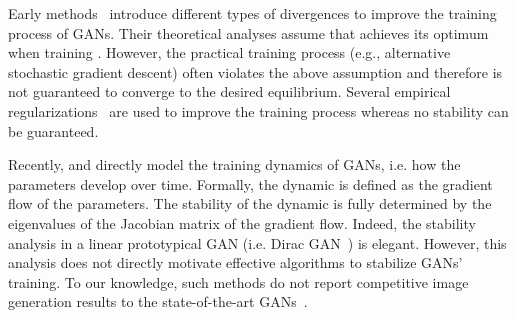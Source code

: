\documentclass{article}
\theoremstyle{definition}
\begin{document}
Early methods~\citep{mao2017least,gulrajani2017improved, arjovsky2017wasserstein,du2018learning} introduce different types of divergences to improve the training process of GANs. Their theoretical analyses assume that  achieves its optimum when training .
However, the practical training process (e.g., alternative stochastic gradient descent) often violates the above assumption and therefore is not guaranteed to converge to the desired equilibrium. Several empirical regularizations~\cite{miyato2018spectral,gulrajani2017improved,zhang2019consistency} are used to improve the training process whereas no stability can be guaranteed.

Recently, \citet{mescheder2017numerics} and \citet{nagarajan2017gradient} directly model the training dynamics of GANs, i.e. how the parameters develop over time. 
Formally, the dynamic is defined as the gradient flow of the parameters.
The stability of the dynamic is fully determined by the eigenvalues of the Jacobian matrix of the gradient flow.
Indeed, the stability analysis in a linear prototypical GAN (i.e. Dirac GAN~\cite{mescheder2018training}) is elegant. 
However, this analysis does not directly motivate effective algorithms to stabilize GANs' training.
To our knowledge, such methods do not report competitive image generation results to the state-of-the-art GANs~\cite{miyato2018spectral}.
\end{document}
